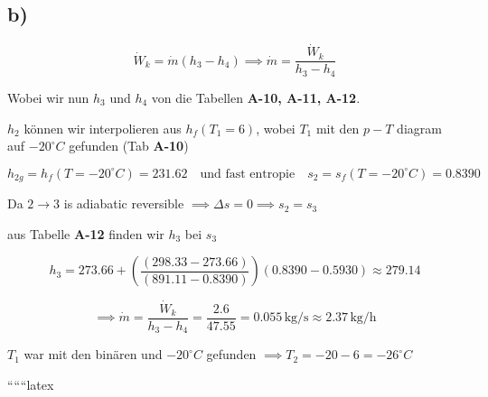 

\subsection*{b)}

\[
\dot{W}_k = \dot{m} \left( h_3 - h_4 \right) \implies \dot{m} = \frac{\dot{W}_k}{h_3 - h_4}
\]

\noindent
Wobei wir nun \( h_3 \) und \( h_4 \) von die Tabellen \textbf{A-10, A-11, A-12}.

\noindent
\( h_2 \) können wir interpolieren aus \( h_f (T_1 = 6) \), wobei \( T_1 \) mit den \( p-T \) diagram auf \(-20^\circ C\) gefunden (Tab \textbf{A-10})

\[
h_{2g} = h_f (T = -20^\circ C) = 231.62 \quad \text{und fast entropie} \quad s_2 = s_f (T = -20^\circ C) = 0.8390
\]

\noindent
Da \( 2 \rightarrow 3 \) is adiabatic reversible \(\implies \Delta s = 0 \implies s_2 = s_3 \)

\noindent
aus Tabelle \textbf{A-12} finden wir \( h_3 \) bei \( s_3 \)

\[
h_3 = 273.66 + \left( \frac{(298.33 - 273.66)}{(891.11 - 0.8390)} \right) (0.8390 - 0.5930) \approx 279.14
\]

\[
\implies \dot{m} = \frac{\dot{W}_k}{h_3 - h_4} = \frac{2.6}{47.55} = 0.055 \, \text{kg/s} \approx 2.37 \, \text{kg/h}
\]

\noindent
\( T_1 \) war mit den binären und \(-20^\circ C\) gefunden \(\implies T_2 = -20 - 6 = -26^\circ C \)

``````latex